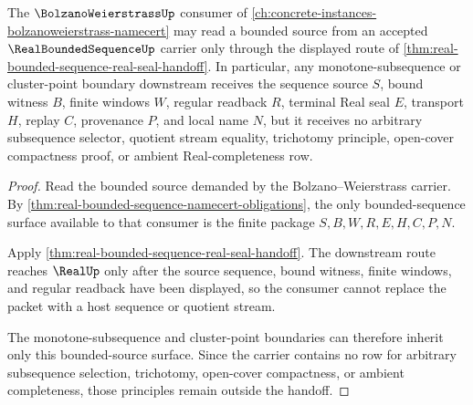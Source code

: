\begin{theorem}
\label{thm:real-bounded-sequence-monotone-subsequence-boundary}
The $\BolzanoWeierstrassUp$ consumer of \autoref{ch:concrete-instances-bolzanoweierstrass-namecert} may read a bounded source from an accepted $\RealBoundedSequenceUp$ carrier only through the displayed route of \autoref{thm:real-bounded-sequence-real-seal-handoff}. In particular, any monotone-subsequence or cluster-point boundary downstream receives the sequence source $S$, bound witness $B$, finite windows $W$, regular readback $R$, terminal Real seal $E$, transport $H$, replay $C$, provenance $P$, and local name $N$, but it receives no arbitrary subsequence selector, quotient stream equality, trichotomy principle, open-cover compactness proof, or ambient Real-completeness row.
\end{theorem}
\begin{proof}
Read the bounded source demanded by the Bolzano--Weierstrass carrier. By \autoref{thm:real-bounded-sequence-namecert-obligations}, the only bounded-sequence surface available to that consumer is the finite package $S,B,W,R,E,H,C,P,N$.

Apply \autoref{thm:real-bounded-sequence-real-seal-handoff}. The downstream route reaches $\RealUp$ only after the source sequence, bound witness, finite windows, and regular readback have been displayed, so the consumer cannot replace the packet with a host sequence or quotient stream.

The monotone-subsequence and cluster-point boundaries can therefore inherit only this bounded-source surface. Since the carrier contains no row for arbitrary subsequence selection, trichotomy, open-cover compactness, or ambient completeness, those principles remain outside the handoff.
\end{proof}

